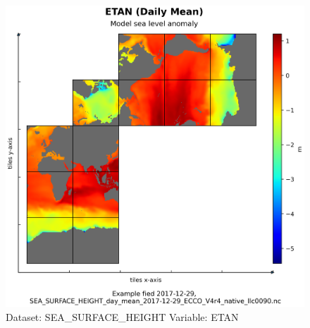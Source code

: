 \begin{figure}[H]
\centering
\includegraphics[scale=0.55]{../images/plots/native_plots/Sea_Surface_Height/ETAN.png}
\caption{Dataset: SEA\_SURFACE\_HEIGHT Variable: ETAN}
\label{tab:table-SEA_SURFACE_HEIGHT_ETAN-Plot}
\end{figure}
\pagebreak

